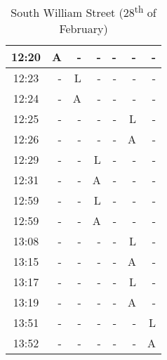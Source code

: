\begin{table}[H]
\begin{minipage}{0.48\textwidth}
\begin{tabular}{|c|r|r|r|r|r|r|}
            \hline\hline
            12:20 & A & - & - & - & - & - \\ \hline
            12:23 & - & L & - & - & - & - \\ \hline
            12:24 & - & A & - & - & - & - \\ \hline
            12:25 & - & - & - & - & L & - \\ \hline
            12:26 & - & - & - & - & A & - \\ \hline
            12:29 & - & - & L & - & - & - \\ \hline
            12:31 & - & - & A & - & - & - \\ \hline
            12:59 & - & - & L & - & - & - \\ \hline
            12:59 & - & - & A & - & - & - \\ \hline
            13:08 & - & - & - & - & L & - \\ \hline
            13:15 & - & - & - & - & A & - \\ \hline
            13:17 & - & - & - & - & L & - \\ \hline
            13:19 & - & - & - & - & A & - \\ \hline
            13:51 & - & - & - & - & - & L \\ \hline
            13:52 & - & - & - & - & - & A \\
            \hline
    \end{tabular}
    \caption{South William Street (28\textsuperscript{th} of February)}
    \label{table:southWilliamStreet} 
    \end{minipage}
\end{table}